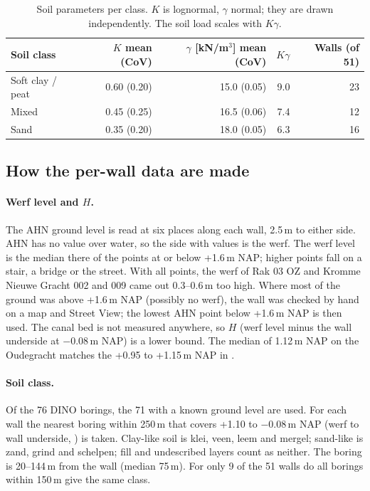 \begin{table}[htbp]
\centering
\small
\caption{Soil parameters per class. $K$ is lognormal, $\gamma$ normal; they
are drawn independently. The soil load scales with $K\gamma$.}
\label{tab:soil}
\begin{tabular}{@{}l r r r r@{}}
\toprule
Soil class & $K$ mean (CoV) & $\gamma$ [kN/m$^3$] mean (CoV) & $K\gamma$ & Walls (of 51) \\
\midrule
Soft clay / peat & 0.60 (0.20) & 15.0 (0.05) & 9.0 & 23 \\
Mixed            & 0.45 (0.25) & 16.5 (0.06) & 7.4 & 12 \\
Sand             & 0.35 (0.20) & 18.0 (0.05) & 6.3 & 16 \\
\bottomrule
\end{tabular}
\end{table}

\subsection{How the per-wall data are made}\label{app:data-method}

\paragraph{Werf level and $H$.} The AHN ground level is read at six places
along each wall, 2.5\,m to either side. AHN has no value over water, so the
side with values is the werf. The werf level is the median there of the points
at or below +1.6\,m NAP; higher points fall on a stair, a bridge or the street.
With all points, the werf of Rak 03 OZ and Kromme Nieuwe Gracht 002 and 009
came out 0.3--0.6\,m too high. Where most of the
ground was above +1.6\,m NAP (possibly no werf), the wall was checked by hand
on a map and Street View; the lowest AHN point below +1.6\,m NAP is then used.
The canal bed is not measured anywhere, so $H$ (werf level minus the wall
underside at $-0.08$\,m NAP) is a lower bound. The median of 1.12\,m NAP on
the Oudegracht matches the +0.95 to +1.15\,m NAP in
\cite{erfgoed156,erfgoed158}.

\paragraph{Soil class.} Of the 76 DINO borings, the 71 with a known ground
level are used. For each wall the nearest boring within 250\,m that covers
+1.10 to $-0.08$\,m NAP (werf to wall underside, \cite{erfgoed158}) is taken.
Clay-like soil is klei, veen, leem and mergel; sand-like is zand, grind and
schelpen; fill and undescribed layers count as neither. The boring is
20--144\,m from the wall (median 75\,m). For only 9 of the 51 walls do all
borings within 150\,m give the same class.

